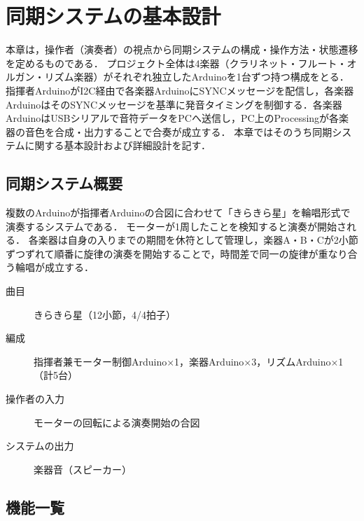 \documentclass[uplatex,dvipdfmx,report]{jlreq}
\begin{document}
\chapter{同期システムの基本設計}

本章は，操作者（演奏者）の視点から同期システムの構成・操作方法・状態遷移を定めるものである．
プロジェクト全体は4楽器（クラリネット・フルート・オルガン・リズム楽器）がそれぞれ独立したArduinoを1台ずつ持つ構成をとる．
指揮者ArduinoがI2C経由で各楽器ArduinoにSYNCメッセージを配信し，各楽器ArduinoはそのSYNCメッセージを基準に発音タイミングを制御する．各楽器ArduinoはUSBシリアルで音符データをPCへ送信し，PC上のProcessingが各楽器の音色を合成・出力することで合奏が成立する．
本章ではそのうち同期システムに関する基本設計および詳細設計を記す．

\section{同期システム概要}

複数のArduinoが指揮者Arduinoの合図に合わせて「きらきら星」を輪唱形式で演奏するシステムである．
モーターが1周したことを検知すると演奏が開始される．
各楽器は自身の入りまでの期間を休符として管理し，楽器A・B・Cが2小節ずつずれて順番に旋律の演奏を開始することで，時間差で同一の旋律が重なり合う輪唱が成立する．

\begin{description}
  \item[曲目] きらきら星（12小節，4/4拍子）
  \item[編成] 指揮者兼モーター制御Arduino×1，楽器Arduino×3，リズムArduino×1（計5台）
  \item[操作者の入力] モーターの回転による演奏開始の合図
  \item[システムの出力] 楽器音（スピーカー）
\end{description}

\section{機能一覧}
\end{document}
